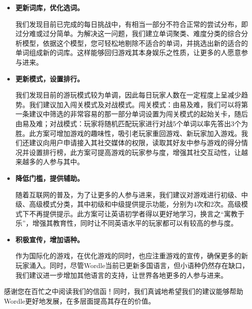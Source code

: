 \documentclass{MathModeling}
\begin{document}
	\begin{itemize}
		\item \textbf{更新词库，优化选词。}
		
		我们发现目前已完成的每日挑战中，有相当一部分不符合正常的尝试分布，即过分难或过分简单。为解决这一问题，我们建立单词聚类、难度分类的综合分析模型，依据这个模型，您可轻松地剔除不适合的单词，并挑选出新的适合的单词组成新的词库。这样能够回归游戏其本身娱乐之性质，让更多的人愿意参与进来。
		\item \textbf{更新模式，设置排行。}
		
		我们发现目前的游玩模式较为单调，因此每日玩家人数在一定程度上呈减少趋势。我们建议加入闯关模式及对战模式。闯关模式：由易及难，我们可以将第一条建议中筛选的非常容易的那一部分单词设置为闯关模式的起始关卡，随后由易及难；对战模式：玩家将随机匹配玩家进行对战5个单词以率先答出3个为胜。此方案可增加游戏的趣味性，吸引老玩家重回游戏、新玩家加入游戏。我们还建议向用户申请接入其社交媒体的权限，读取其好友中参与游戏的得分情况并设置排行榜，此方案可提高游戏的玩家参与度，增强其社交互动性，让越来越多的人参与其中。
		\item \textbf{降低门槛，提供辅助。}
		
		随着互联网的普及，为了让更多的人参与进来，我们建议对游戏进行初级、中级、高级模式分类，其中初级和中级提供提示功能，分别为4次和2次。高级模式下不再提供提示。此方案可让英语初学者得以更好地学习，换言之“寓教于乐”，增强其教育性，同时让不同英语水平的玩家都可以有较高的参与度。
		\item \textbf{积极宣传，增加语种。}
		
		作为国际化的游戏，在优化游戏的同时，也应注重游戏的宣传，确保更多的新玩家涌入。同时，尽管Wordle当前已更新多国语言，但小语种仍然存在缺口，我们建议进一步增加其他语言的支持，让世界各地更多的人参与进来。
	\end{itemize}
	
	感谢您在百忙之中阅读我们的信函！同时，我们真诚地希望我们的建议能够帮助Wordle更好地发展，在多层面提高其存在的价值。

	~\\



	\newpage
\end{document}
